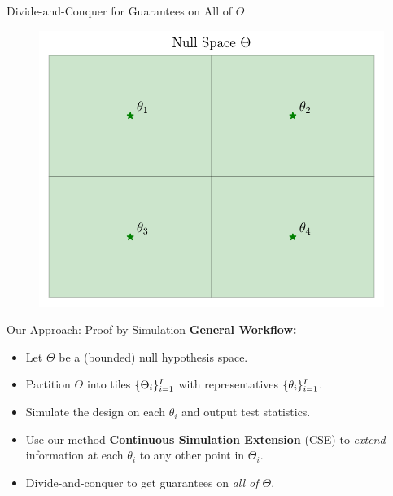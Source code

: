 \begin{frame}{Divide-and-Conquer for Guarantees on All of $\Theta$}
\begin{figure}
    \centering
    \includegraphics[width=0.95\linewidth]{figs/approach_5.pdf}
\end{figure} 
\end{frame}

\begin{frame}{Our Approach: Proof-by-Simulation}
\textbf{General Workflow:}
\begin{itemize}
    \item Let $\Theta$ be a (bounded) null hypothesis space.
    \item Partition $\Theta$ into tiles $\{\Theta_i\}_{i=1}^I$ 
        with representatives $\{\theta_i\}_{i=1}^I$.
    \item Simulate the design on each $\theta_i$ and output test statistics.
    \item Use our method \textbf{Continuous Simulation Extension} (CSE) to 
        \emph{extend} information at each $\theta_i$ to any other point in $\Theta_i$.
    \item Divide-and-conquer to get guarantees on \emph{all of $\Theta$}.
\end{itemize}
\end{frame}

